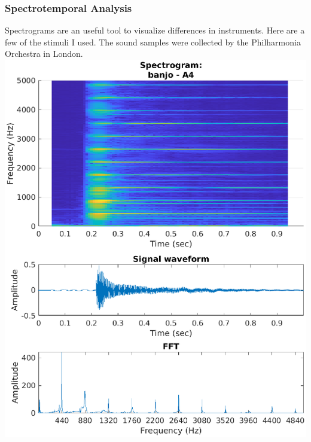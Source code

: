 \documentclass[aspectratio=1610]{beamer}
\begin{document}
\begin{frame}
\frametitle{Spectrotemporal Analysis}
Spectrograms are an useful tool to visualize differences in instruments. Here are a few of the stimuli I used. The sound samples were collected by the Philharmonia Orchestra in London.\\ 
\vspace{.6em}
\centering
\href{./Audio/banjo_A4_normal.mp3}{\includegraphics[height = .55\textheight]{spectrogram_banjo_normal}}

\end{frame}
\end{document}
